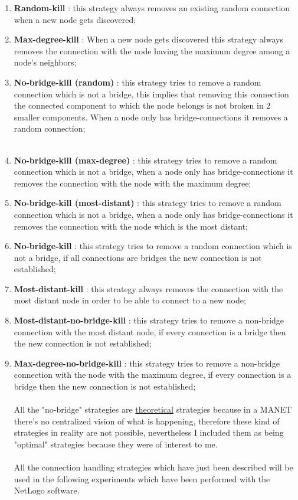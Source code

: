 \documentclass{llncs}
\begin{document}
\begin{enumerate}
	\item \textbf{Random-kill} : this strategy always removes an existing random connection when a new node gets discovered;
	\\
	\item \textbf{Max-degree-kill} : When a new node gets discovered this strategy always removes the connection with the node having the maximum degree among a node's neighbors;
	\\
	\item \textbf{No-bridge-kill (random)} : this strategy tries to remove a random connection which is not a bridge, this implies that removing this connection the connected component to which the node belongs is not broken in 2 smaller components. When a node only has bridge-connections it removes a random connection;
	\\\\
	\item \textbf{No-bridge-kill (max-degree)} : this strategy tries to remove a random connection which is not a bridge, when a node only has bridge-connections it removes the connection with the node with the maximum degree;
	\\
	\item \textbf{No-bridge-kill (most-distant)} : this strategy tries to remove a random connection which is not a bridge, when a node only has bridge-connections it removes the connection with the node which is the most distant;
	\\
	\item \textbf{No-bridge-kill} : this strategy tries to remove a random connection which is not a bridge, if all connections are bridges the new connection is not established;
	\\
	\item \textbf{Most-distant-kill} : this strategy always removes the connection with the most distant node in order to be able to connect to a new node;
	\\
	\item \textbf{Most-distant-no-bridge-kill} : this strategy tries to remove a non-bridge connection with the most distant node, if every connection is a bridge then the new connection is not established;
	\\
	\item \textbf{Max-degree-no-bridge-kill} : this strategy tries to remove a non-bridge connection with the node with the maximum degree, if every connection is a bridge then the new connection is not established;
	\\\\
	All the "no-bridge" strategies are \underline{theoretical} strategies because in a MANET there's no centralized vision of what is happening, therefore these kind of strategies in reality are not possible, nevertheless I included them as being "optimal" strategies because they were of interest to me.
	\\\\
	All the connection handling strategies which have just been described will be used in the following experiments which have been performed with the NetLogo software.
\end{enumerate}
%
\end{document}
